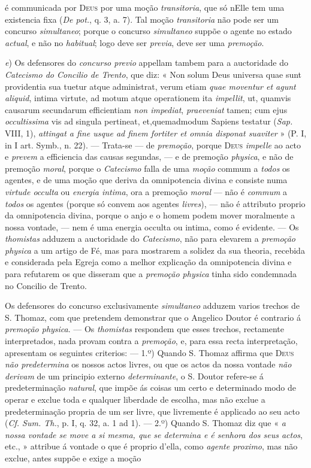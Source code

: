 é communicada por \textsc{Deus} por uma moção \emph{transitoria}, que só nElle tem uma existencia fixa (\emph{De pot.}, q. 3, a. 7). Tal moção \emph{transitoria} não pode ser um concurso \emph{simultaneo}; porque o concurso \emph{simultaneo} suppõe o agente no estado \emph{actual}, e não no \emph{habitual}; logo deve ser \emph{previa}, deve ser uma \emph{premoção}.\par \emph{e}) Os defensores do \emph{concurso previo} appellam tambem para a auctoridade do \emph{Catecismo do Concilio de Trento}, que diz: « Non solum Deus universa quae sunt providentia sua tuetur atque administrat, verum etiam \emph{quae moventur et agunt aliquid}, intima virtute, ad motum atque operationem ita \emph{impellit}, ut, quamvis causarum secundarum efficientiam \emph{non impediat}, \emph{praeveniat} tamen; cum ejus \emph{occultissima} vis ad singula pertineat, et,quemadmodum Sapiens testatur (\emph{Sap.} VIII, 1), \emph{attingat a fine usque ad finem fortiter et omnia disponat suaviter} » (P. I, in I art. Symb., n. 22). --- Trata-se --- de \emph{premoção}, porque \textsc{Deus} \emph{impelle} ao acto e \emph{prevem} a efficiencia das causas segundas, --- e de premoção \emph{physica}, e não de premoção \emph{moral}, porque o \emph{Catecismo} falla de uma \emph{moção} commum a \emph{todos} os agentes, e de uma moção que deriva da omnipotencia divina e consiste numa \emph{virtude occulta} ou \emph{energia intima}, ora a premoção \emph{moral} --- não é \emph{commum} a \emph{todos} os agentes (porque só convem aos agentes \emph{livres}), --- não é attributo proprio da omnipotencia divina, porque o anjo e o homem podem mover moralmente a nossa vontade, --- nem é uma energia occulta ou intima, como é evidente. --- Os \emph{thomistas} adduzem a auctoridade do \emph{Catecismo}, não para elevarem a \emph{premoção physica} a um artigo de Fé, mas para mostrarem a solidez da sua theoria, recebida e considerada pela Egreja como a melhor explicação da omnipotencia divina e para refutarem os que disseram que a \emph{premoção physica} tinha sido condemnada no Concilio de Trento.\par Os defensores do concurso exclusivamente \emph{simultaneo} adduzem varios trechos de S. Thomaz, com que pretendem demonstrar que o Angelico Doutor é contrario á \emph{premoção physica}. --- Os \emph{thomistas} respondem que esses trechos, rectamente interpretados, nada provam contra a \emph{premoção}, e, para essa recta interpretação, apresentam os seguintes criterios: --- 1.º) Quando S. Thomaz affirma que \textsc{Deus} \emph{não predetermina} os nossos actos livres, ou que os actos da nossa vontade \emph{não derivam} de um principio externo \emph{determinante}, o S. Doutor refere-se á predeterminação \emph{natural}, que impõe ás coisas um certo e determinado modo de operar e exclue toda e qualquer liberdade de escolha, mas não exclue a predeterminação propria de um ser livre, que livremente é applicado ao seu acto (\emph{Cf. Sum. Th.}, p. I, q. 32, a. 1 ad 1). --- 2.º) Quando S. Thomaz diz que « \emph{a nossa vontade se move a si mesma, que se determina e é senhora dos seus actos}, etc., » attribue á vontade o que é proprio d'ella, como \emph{agente proximo}, mas não exclue, antes suppõe e exige a moção 
